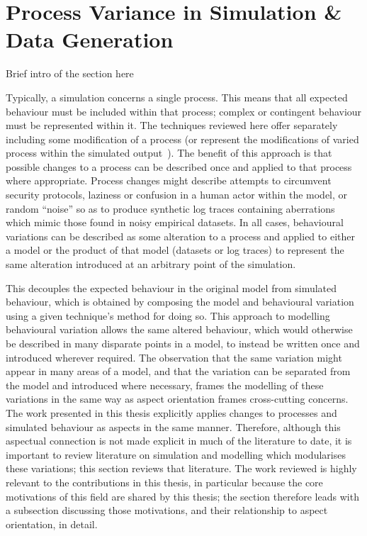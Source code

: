 \section{Process Variance in Simulation \& Data Generation}\label{sec:dynamism_in_sm}

Brief intro of the section here~


Typically, a simulation concerns a single process.%
This means that all expected
behaviour must be included within that process; complex or contingent behaviour
must be represented within it. The techniques reviewed here offer separately
including some modification of a process (or represent the modifications of
varied process within the simulated
output~\cite{stocker2013secsy,stocker2014secsy}). The benefit of this approach
is that possible changes to a process can be described once and applied to that
process where appropriate. Process changes might describe attempts to circumvent
security protocols, laziness or confusion in a human actor within the model, or
random ``noise'' so as to produce synthetic log traces containing aberrations
which mimic those found in noisy empirical datasets. In all cases, behavioural
variations can be described as some alteration to a process and applied to
either a model or the product of that model (datasets or log traces) to
represent the same alteration introduced at an arbitrary point of the
simulation.

This decouples the expected behaviour in the original model from simulated
behaviour, which is obtained by composing the model and behavioural variation
using a given technique's method for doing so. This approach to modelling
behavioural variation allows the same altered behaviour, which would otherwise
be described in many disparate points in a model, to instead be written once and
introduced wherever required. The observation that the same variation might
appear in many areas of a model, and that the variation can be separated from
the model and introduced where necessary, frames the modelling of these
variations in the same way as aspect orientation frames cross-cutting concerns.
The work presented in this thesis explicitly applies changes to processes and
simulated behaviour as aspects in the same manner. Therefore, although this
aspectual connection is not made explicit in much of the literature to date, it
is important to review literature on simulation and modelling which modularises
these variations; this section reviews that literature. The work reviewed is
highly relevant to the contributions in this thesis, in particular because the
core motivations of this field are shared by this thesis; the section therefore
leads with a subsection discussing those motivations, and their relationship to
aspect orientation, in detail.


